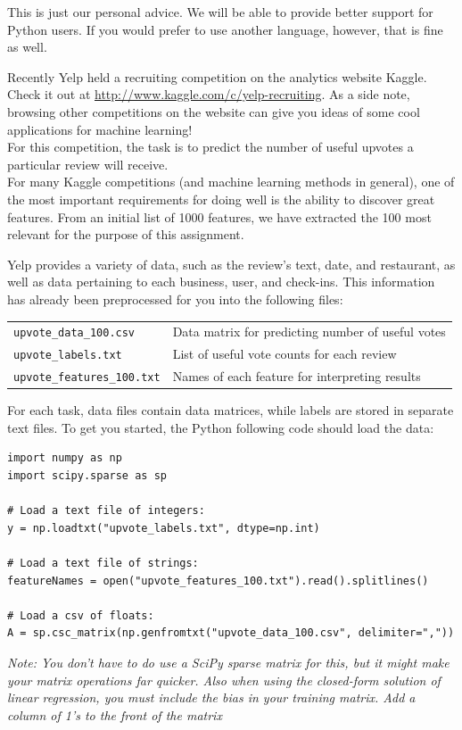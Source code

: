 \documentclass[letterpaper]{article}
\begin{document}
\noindent This is just our personal advice. We will be able to provide better support for Python users. If you would prefer to use another language, however, that is fine as well.

\noindent Recently Yelp held a recruiting competition on the analytics
website Kaggle.  Check it out at \url{http://www.kaggle.com/c/yelp-recruiting}. 
As a side note, browsing other competitions on the website can give you ideas of some cool applications for machine learning!\\

\noindent For this competition, the task is to predict the number of useful upvotes a particular review will receive. \\

\noindent For many Kaggle competitions (and machine learning methods in general), one of the most important requirements for doing well
is the ability to discover great features.  From an initial list of 1000 features, we have extracted the 100 most relevant for the purpose
of this assignment.

\noindent Yelp provides a variety of data, such as the review's text, date, and restaurant, 
as well as data pertaining to each business, user, and check-ins.  This information has already been
preprocessed for you into the following files:

\begin{center}
\begin{tabular}{l l}
\texttt{upvote\_data\_100.csv} & Data matrix for predicting number of useful votes  \\
\texttt{upvote\_labels.txt} &  List of useful vote counts for each review \\
\texttt{upvote\_features\_100.txt} & Names of each feature for interpreting results \\
\end{tabular}
\end{center}

\noindent For each task, data files contain data matrices, while labels are stored in separate text files. To get you started, the Python following code should load the data:

\begin{verbatim}
import numpy as np
import scipy.sparse as sp

# Load a text file of integers:
y = np.loadtxt("upvote_labels.txt", dtype=np.int)

# Load a text file of strings:
featureNames = open("upvote_features_100.txt").read().splitlines()

# Load a csv of floats:
A = sp.csc_matrix(np.genfromtxt("upvote_data_100.csv", delimiter=","))

\end{verbatim}
\noindent\emph{Note: You don't have to do use a SciPy sparse matrix for this, but it might make your matrix operations far quicker. Also when using the closed-form solution of linear regression, you must include the bias in your training matrix. Add a column of 1's to the front of the matrix}
\end{document}
